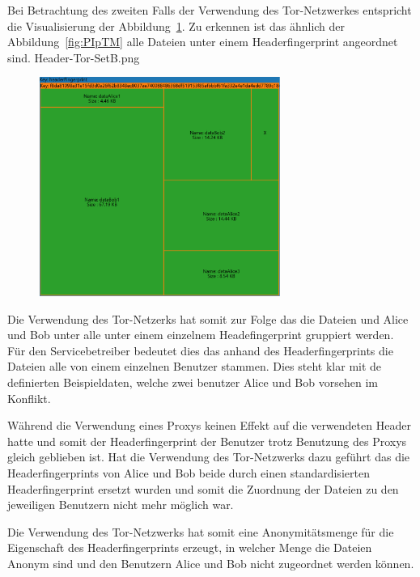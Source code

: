 \documentclass[
    fontsize=12pt,
    headings=small,
    parskip=half,           %
    bibliography=totoc,
    numbers=noenddot,       %
    open=any,               %
    ]{scrreprt}
\begin{document}
Bei Betrachtung des zweiten Falls der Verwendung des Tor-Netzwerkes entspricht die Visualisierung der Abbildung~\ref{fig:THTM}.
Zu erkennen ist das ähnlich der Abbildung~\ref{fig:PIpTM} alle Dateien unter einem Headerfingerprint angeordnet sind.
Header-Tor-SetB.png
\begin{figure}[H]
\includegraphics[width=0.7\textwidth]{../pic/Header-Tor-SetB.png}
\label{fig:THTM}
\end{figure}

Die Verwendung des Tor-Netzerks hat somit zur Folge das die Dateien und Alice und Bob unter alle unter einem einzelnem Headefingerprint gruppiert werden. 
Für den Servicebetreiber bedeutet dies das anhand des Headerfingerprints die Dateien alle von einem einzelnen Benutzer stammen. 
Dies steht klar mit de definierten Beispieldaten, welche zwei benutzer Alice und Bob vorsehen im Konflikt.

Während die Verwendung eines Proxys keinen Effekt auf die verwendeten Header hatte und somit der Headerfingerprint der Benutzer trotz Benutzung des Proxys gleich geblieben ist. 
Hat die Verwendung des Tor-Netzwerks dazu geführt das die Headerfingerprints von Alice und Bob beide durch einen standardisierten Headerfingerprint ersetzt wurden und somit die Zuordnung der Dateien zu den jeweiligen Benutzern nicht mehr möglich war.

Die Verwendung des Tor-Netzwerks hat somit eine Anonymitätsmenge für die Eigenschaft des Headerfingerprints erzeugt, in welcher Menge die Dateien Anonym sind und den Benutzern Alice und Bob nicht zugeordnet werden können.
\end{document}
